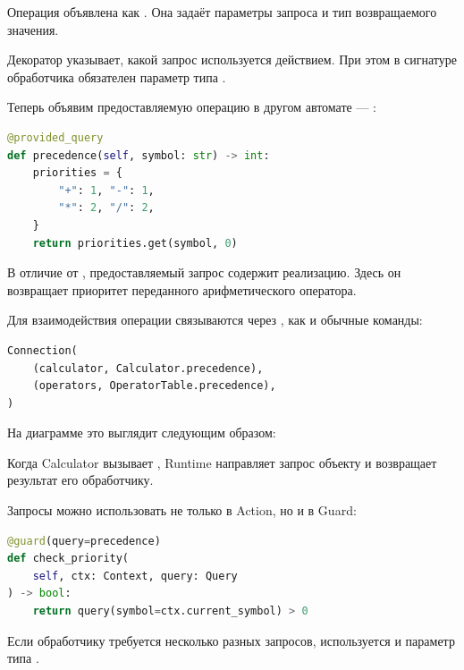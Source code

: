 Операция  объявлена как
. Она задаёт параметры запроса
и тип возвращаемого значения.

Декоратор 
указывает, какой запрос используется действием.
При этом в сигнатуре обработчика обязателен
параметр типа .

Теперь объявим предоставляемую операцию в другом
автомате --- :

\begin{lstlisting}[language=Python,numbers=none]
@provided_query
def precedence(self, symbol: str) -> int:
    priorities = {
        "+": 1, "-": 1,
        "*": 2, "/": 2,
    }
    return priorities.get(symbol, 0)
\end{lstlisting}

В отличие от , предоставляемый
запрос содержит реализацию. Здесь он возвращает
приоритет переданного арифметического оператора.

Для взаимодействия операции связываются через
, как и обычные команды:

\begin{lstlisting}[language=Python,numbers=none]
Connection(
    (calculator, Calculator.precedence),
    (operators, OperatorTable.precedence),
)
\end{lstlisting}

На диаграмме это выглядит следующим образом:

\noindent\begin{minipage}{\textwidth}
  \centering
  
  \label{fig:query-connection}
\end{minipage}

Когда Calculator вызывает ,
Runtime направляет запрос объекту 
и возвращает результат его обработчику.

Запросы можно использовать не только в Action,
но и в Guard:

\begin{lstlisting}[language=Python,numbers=none]
@guard(query=precedence)
def check_priority(
    self, ctx: Context, query: Query
) -> bool:
    return query(symbol=ctx.current_symbol) > 0
\end{lstlisting}

Если обработчику требуется несколько разных
запросов, используется 
и параметр типа .

